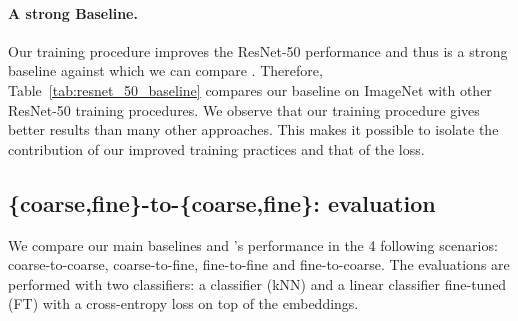 \paragraph{A strong Baseline.}

Our training procedure improves the ResNet-50 performance and thus is a strong baseline against which we can compare \ours.
Therefore, Table~\ref{tab:resnet_50_baseline} compares our baseline on ImageNet with other ResNet-50 training procedures.
We observe that our training procedure gives better results than many other approaches. 
This makes it possible to isolate the contribution of our improved training practices and that of the \ours loss.

    \begin{table}[t]
    \caption{Performance comparison (top-1 accuracy) with our ResNet-50 baseline and state of the art ResNet-50 on ImageNet. All results are with single center crop evaluation with image resolution $224 \times 224$.
    \label{tab:resnet_50_baseline}}
    \centering
    \end{table} 
\subsection{\{coarse,fine\}-to-\{coarse,fine\}: evaluation}
\label{subsec:eval_fc}

We compare our main baselines and \ours's performance in the 4 following scenarios: coarse-to-coarse, coarse-to-fine, fine-to-fine and fine-to-coarse.
The evaluations are performed with two classifiers: a \knn classifier (kNN) and a linear classifier fine-tuned (FT) with a cross-entropy loss on top of the embeddings. 

